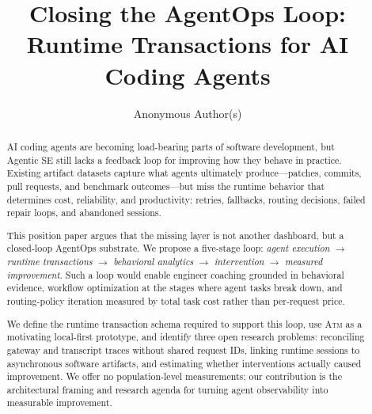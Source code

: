 \documentclass[sigconf,anonymous,review]{acmart}
\newcommand{\atm}{\textsc{Atm}\xspace}
\begin{document}
\title{Closing the AgentOps Loop:\\
       Runtime Transactions for AI Coding Agents}

\author{Anonymous Author(s)}

\begin{abstract}
AI coding agents are becoming load-bearing parts of software
development, but Agentic SE still lacks a feedback loop for improving
how they behave in practice. Existing artifact datasets capture what
agents ultimately produce---patches, commits, pull requests, and
benchmark outcomes---but miss the runtime behavior that determines
cost, reliability, and productivity: retries, fallbacks, routing
decisions, failed repair loops, and abandoned sessions.

This position paper argues that the missing layer is not another
dashboard, but a closed-loop AgentOps substrate. We propose a five-stage
loop: \emph{agent execution} $\to$ \emph{runtime transactions} $\to$
\emph{behavioral analytics} $\to$ \emph{intervention} $\to$
\emph{measured improvement}. Such a loop would enable engineer coaching
grounded in behavioral evidence, workflow optimization at the stages
where agent tasks break down, and routing-policy iteration measured by
total task cost rather than per-request price.

We define the runtime transaction schema required to support this loop,
use \atm as a motivating local-first prototype, and identify three open
research problems: reconciling gateway and transcript traces without
shared request IDs, linking runtime sessions to asynchronous software
artifacts, and estimating whether interventions actually caused
improvement. We offer no population-level measurements; our contribution
is the architectural framing and research agenda for turning agent
observability into measurable improvement.
\end{abstract}


\maketitle
\end{document}
